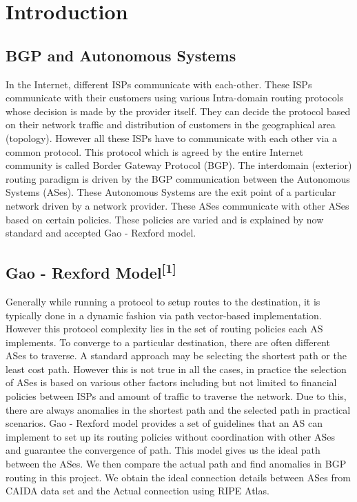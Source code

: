 \documentclass{sig-alternate-05-2015}
\begin{document}

\section{Introduction}
\subsection{BGP and Autonomous Systems}
In the Internet, different ISPs communicate with each-other. These ISPs communicate with their customers using various Intra-domain routing protocols whose decision is made by the provider itself. They can decide the protocol based on their network traffic and distribution of customers in the geographical area (topology). However all these ISPs have to communicate with each other via a common protocol. This protocol which is agreed by the entire Internet community is called Border Gateway Protocol (BGP). The interdomain (exterior) routing paradigm is driven by the BGP communication between the Autonomous Systems (ASes). These Autonomous Systems are the exit point of a particular network driven by a network provider. These ASes communicate with other ASes based on certain policies. These policies are varied and is explained by now standard and accepted Gao - Rexford model.

\subsection{Gao - Rexford Model\textsuperscript{[1]}}
Generally while running a protocol to setup routes to the destination, it is typically done in a dynamic fashion via path vector-based implementation. However this protocol complexity lies in the set of routing policies each AS implements. To converge to a particular destination, there are often different ASes to traverse. A standard approach may be selecting the shortest path or the least cost path. However this is not true in all the cases, in practice the selection of ASes is based on various other factors including but not limited to financial policies between ISPs and amount of traffic to traverse the network. Due to this, there are always anomalies in the shortest path and the selected path in practical scenarios. Gao - Rexford model provides a set of guidelines that an AS can implement to set up its routing policies without coordination with other ASes and guarantee the convergence of path. This model gives us the ideal path between the ASes. We then compare the actual path and find anomalies in BGP routing in this project. We obtain the ideal connection details between ASes from CAIDA data set and the Actual connection using RIPE Atlas.
\end{document}
